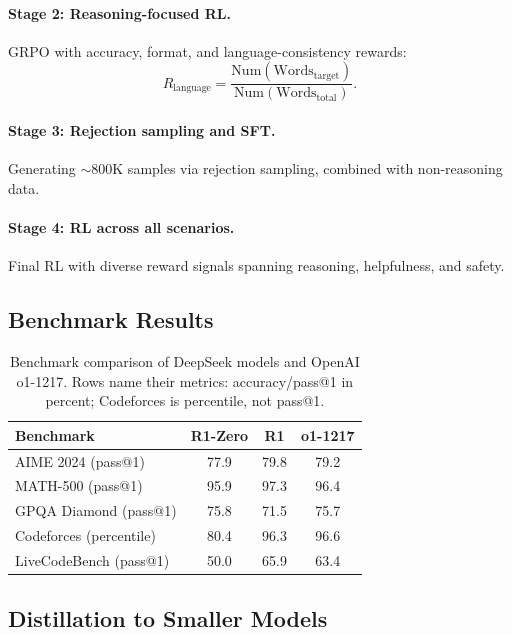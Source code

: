 \documentclass[12pt,a4paper]{report}
\begin{document}
\paragraph{Stage 2: Reasoning-focused RL.} GRPO with accuracy, format, and language-consistency rewards:
\begin{equation}
    R_{\text{language}} = \frac{\text{Num}(\text{Words}_{\text{target}})}{\text{Num}(\text{Words}_{\text{total}})}.
\end{equation}

\paragraph{Stage 3: Rejection sampling and SFT.} Generating $\sim$800K samples via rejection sampling, combined with non-reasoning data.

\paragraph{Stage 4: RL across all scenarios.} Final RL with diverse reward signals spanning reasoning, helpfulness, and safety.

\subsection{Benchmark Results}

\begin{table}[ht]
\centering
\caption{Benchmark comparison of DeepSeek models and OpenAI o1-1217. Rows name their metrics: accuracy/pass@1 in percent; Codeforces is percentile, not pass@1.}
\label{tab:deepseek-r1-results}
\begin{tabular}{lccc}
\toprule
\textbf{Benchmark} & \textbf{R1-Zero} & \textbf{R1} & \textbf{o1-1217} \\
\midrule
AIME 2024 (pass@1)       & 77.9  & 79.8  & 79.2 \\
MATH-500 (pass@1)        & 95.9  & 97.3  & 96.4 \\
GPQA Diamond (pass@1)    & 75.8  & 71.5  & 75.7 \\
Codeforces (percentile)  & 80.4  & 96.3  & 96.6 \\
LiveCodeBench (pass@1)   & 50.0  & 65.9  & 63.4 \\
\bottomrule
\end{tabular}
\end{table}

\subsection{Distillation to Smaller Models}
\end{document}
